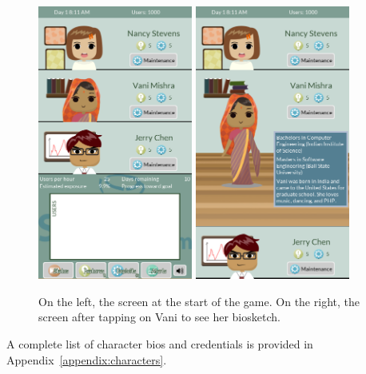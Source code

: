 \documentclass[letterpaper]{article}
\begin{document}
\begin{figure}\centering
\begin{framed}
\includegraphics[width=2in]{images/screen-start.png}
\includegraphics[width=2in]{images/screen-bio-open.png}
\caption{On the left, the screen at the start of the game.
 On the right, the screen after tapping on Vani to see her
 biosketch.}
\label{fig:bio}
\end{framed}
\end{figure}
%
A complete list of character bios and credentials is provided in 
Appendix~\ref{appendix:characters}.
\end{document}
